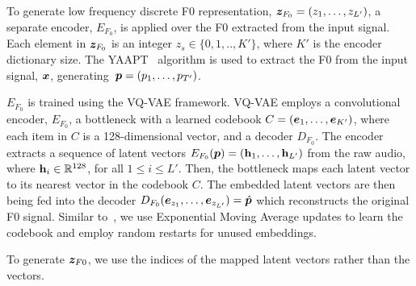 {} 
To generate low frequency discrete F0 representation, $\bm{z}_{F_0}=(z_1, \dots, z_{L'})$, a separate encoder, $E_{F_0}$, is applied over the F0 extracted from the input signal. Each element in $\bm{z}_{F_0}$ is an integer $z_s\in\{0,1,..,K'\}$, where $K'$ is the encoder dictionary size. The YAAPT~\cite{yaapt} algorithm is used to extract the F0 from the input signal, $\bm{x}$, generating~$\bm{p} = (p_1, \dots, p_{T'})$. 

$E_{F_0}$ is trained using the VQ-VAE framework. VQ-VAE employs a convolutional encoder, $E_{F_0}$,  a bottleneck with a learned codebook $C = (\bm{e}_1, \dots, \bm{e}_{K'})$, where each item in $C$ is a 128-dimensional vector, and a decoder $D_{F_0}$. The encoder extracts a sequence of latent vectors $E_{F_0}(\bm{p})=({\bf{h}}_1, \dots, {\bf{h}}_{L'})$ 
from the raw audio, where ${\bf{h}}_i \in \mathbb{R}^{128}$, for all $1 \le i \le L'$. 
Then, the bottleneck maps each latent vector to its nearest vector in the codebook $C$. The embedded latent vectors are then being fed into the decoder $D_{F_0}(\bm{e}_{z_1}, \dots, \bm{e}_{z_{L'}}) = \hat{\bm{p}}$ which reconstructs the original F0 signal. Similar to~\cite{jukebox}, we use Exponential Moving Average updates to learn the codebook and employ random restarts for unused embeddings. 


To generate $\bm{z}_{F0}$, we use the indices of the mapped latent vectors rather than the vectors. 

